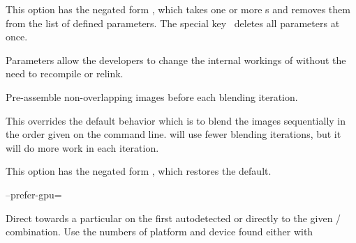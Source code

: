 \begin{codelist}
  This option has the negated form %
  , which takes one or more s and removes them from the list
  of defined parameters.  The special key~\sample{*} deletes all parameters at once.

  Parameters allow the developers to change the internal workings of \App{} without the need to
  recompile or relink.

\begin{sgquote}

\end{sgquote}


\ifenblend
    \label{opt:pre-assemble}%
  \item[\itempar{-a \\ --pre-assemble}]\itemend
    Pre-assemble non-overlapping images before
    each blending iteration.

    This overrides
    the default behavior which is to blend the images sequentially in the order given on the
    command line.  \App{} will use fewer blending iterations, but it will do more work in each
    iteration.

    This option has the negated form %
    , which restores the default.
\fi


  \label{opt:prefer-gpu}%
\item[--prefer-gpu=\optional{\metavar{PLATFORM}:}\metavar{DEVICE}
  \restrictednote{\acronym{OpenCL}-enabled versions only.}]\itemend

  Direct \App{} towards a particular 
   on the first autodetected
   or directly to the given
  \slash{} combination.  Use the numbers of platform and device
  found either with


\end{codelist}
